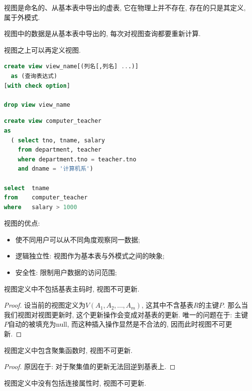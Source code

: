 \begin{definition}[视图]
  视图是命名的、从基本表中导出的虚表, 它在物理上并不存在, 存在的只是其定义, 属于外模式.

  视图中的数据是从基本表中导出的, 每次对视图查询都要重新计算.

  视图之上可以再定义视图.
\end{definition}

\begin{lstlisting}[language=SQL]
create view view_name[(列名[,列名] ...)]
  as (查询表达式)
[with check option]

drop view view_name
\end{lstlisting}

\begin{lstlisting}[language=SQL]
create view computer_teacher
as
  ( select tno, tname, salary
    from department, teacher
    where department.tno = teacher.tno
    and dname = '计算机系')

select  tname
from    computer_teacher
where   salary > 1000
\end{lstlisting}

视图的优点:
\begin{itemize}
  \item 使不同用户可以从不同角度观察同一数据;
  \item 逻辑独立性: 视图作为基本表与外模式之间的映象;
  \item 安全性: 限制用户数据的访问范围;
\end{itemize}

\begin{theorem}
  视图定义中不包括基表主码时, 视图不可更新.
\end{theorem}

\begin{proof}
  设当前的视图定义为$V(A_1,A_2,...,A_m)$, 这其中不含基表$R$的主键$P$. 那么当我们视图对视图更新时, 这个更新操作会变成对基表的更新. 唯一的问题在于: 主键$P$自动的被填充为null, 而这种插入操作显然是不合法的, 因而此时视图不可更新.
\end{proof}

\begin{theorem}
  视图定义中包含聚集函数时, 视图不可更新.
\end{theorem}

\begin{proof}
  原因在于: 对于聚集值的更新无法回逆到基表上.
\end{proof}

\begin{theorem}
  视图定义中没有包括连接属性时, 视图不可更新.
\end{theorem}

